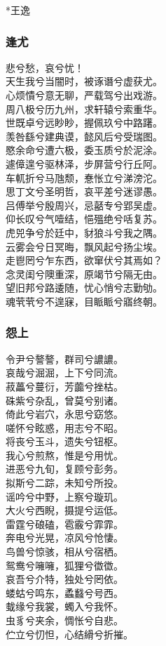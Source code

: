 \documentclass[]{article}
\begin{document}
*王逸

\hypertarget{header-n370}{%
\subsubsection{逢尤}\label{header-n370}}

悲兮愁，哀兮忧！\\
天生我兮当闇时，被诼谮兮虚获尤。\\
心烦憒兮意无聊，严载驾兮出戏游。\\
周八极兮历九州，求轩辕兮索重华。\\
世既卓兮远眇眇，握佩玖兮中路躇。\\
羡咎繇兮建典谟，懿风后兮受瑞图。\\
愍余命兮遭六极，委玉质兮於泥涂。\\
遽傽遑兮驱林泽，步屏营兮行丘阿。\\
车軏折兮马虺颓，惷怅立兮涕滂沱。\\
思丁文兮圣明哲，哀平差兮迷谬愚。\\
吕傅举兮殷周兴，忌嚭专兮郢吴虚。\\
仰长叹兮气噎结，悒殟绝兮咶复苏。\\
虎兕争兮於廷中，豺狼斗兮我之隅。\\
云雾会兮日冥晦，飘风起兮扬尘埃。\\
走鬯罔兮乍东西，欲窜伏兮其焉如？\\
念灵闺兮隩重深，原竭节兮隔无由。\\
望旧邦兮路逶随，忧心悄兮志勤劬。\\
魂茕茕兮不遑寐，目眽眽兮寤终朝。

\hypertarget{header-n375}{%
\subsubsection{怨上}\label{header-n375}}

令尹兮謷謷，群司兮譨譨。\\
哀哉兮淈淈，上下兮同流。\\
菽藟兮蔓衍，芳虈兮挫枯。\\
硃紫兮杂乱，曾莫兮别诸。\\
倚此兮岩穴，永思兮窈悠。\\
嗟怀兮眩惑，用志兮不昭。\\
将丧兮玉斗，遗失兮钮枢。\\
我心兮煎熬，惟是兮用忧。\\
进恶兮九旬，复顾兮彭务。\\
拟斯兮二踪，未知兮所投。\\
谣吟兮中野，上察兮璇玑。\\
大火兮西睨，摄提兮运低。\\
雷霆兮硠磕，雹霰兮霏霏。\\
奔电兮光晃，凉风兮怆悽。\\
鸟兽兮惊骇，相从兮宿栖。\\
鸳鸯兮噰噰，狐狸兮徾徾。\\
哀吾兮介特，独处兮罔依。\\
蝼蛄兮鸣东，蟊蠽兮号西。\\
蛓缘兮我裳，蠋入兮我怀。\\
虫豸兮夹余，惆怅兮自悲。\\
伫立兮忉怛，心结縎兮折摧。
\end{document}
